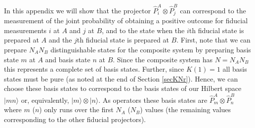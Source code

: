 \documentclass[10pt,twocolumn]{article}
\begin{document}
\vspace{6mm}


\vspace{6mm}

In this appendix we will show that the projector
$\hat{P}^A_i\otimes\hat{P}^B_j$ can correspond to the measurement of the joint
probability of obtaining a positive outcome for fiducial measurements
$i$ at $A$ and $j$ at $B$, and to the state when the $i$th fiducial
state is prepared at $A$ and the $j$th fiducial state is prepared at
$B$. First, note that we can prepare $N_AN_B$ distinguishable states
for the composite system by preparing basis state $m$ at $A$ and basis
state $n$ at $B$.  Since the composite system has $N=N_AN_B$ this
represents a complete set of basis states.  Further, since $K(1)=1$ all
basis states must be pure (as noted at the end of Section \ref{secKNr}).
Hence, we can choose these basis states to correspond to the basis states of
our Hilbert space $|mn\rangle$ or, equivalently,
$|m\rangle\otimes|n\rangle$.  As operators these basis states are
$\hat{P}^A_m\otimes\hat{P}^B_n$ where $m$ ($n$) only runs over the first
$N_A$ ($N_B$) values (the remaining values corresponding to the other
fiducial projectors).
\end{document}
